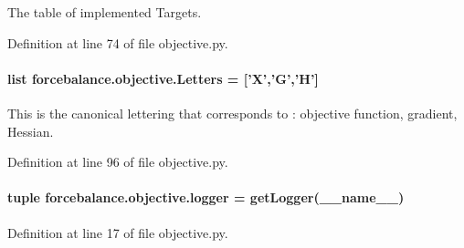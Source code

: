 The table of implemented Targets. 



Definition at line 74 of file objective.\-py.

\hypertarget{namespaceforcebalance_1_1objective_a89a971322532b36852765b2680651f1f}{
\paragraph[{Letters}]{\setlength{\rightskip}{0pt plus 5cm}list forcebalance.\-objective.\-Letters = \mbox{[}'X','G','H'\mbox{]}}}\label{namespaceforcebalance_1_1objective_a89a971322532b36852765b2680651f1f}


This is the canonical lettering that corresponds to \-: objective function, gradient, Hessian. 



Definition at line 96 of file objective.\-py.

\hypertarget{namespaceforcebalance_1_1objective_ac2e1e8c9612652836168e5cdde77b6e7}{
\paragraph[{logger}]{\setlength{\rightskip}{0pt plus 5cm}tuple forcebalance.\-objective.\-logger = get\-Logger(\-\_\-\-\_\-name\-\_\-\-\_\-)}}\label{namespaceforcebalance_1_1objective_ac2e1e8c9612652836168e5cdde77b6e7}


Definition at line 17 of file objective.\-py.

